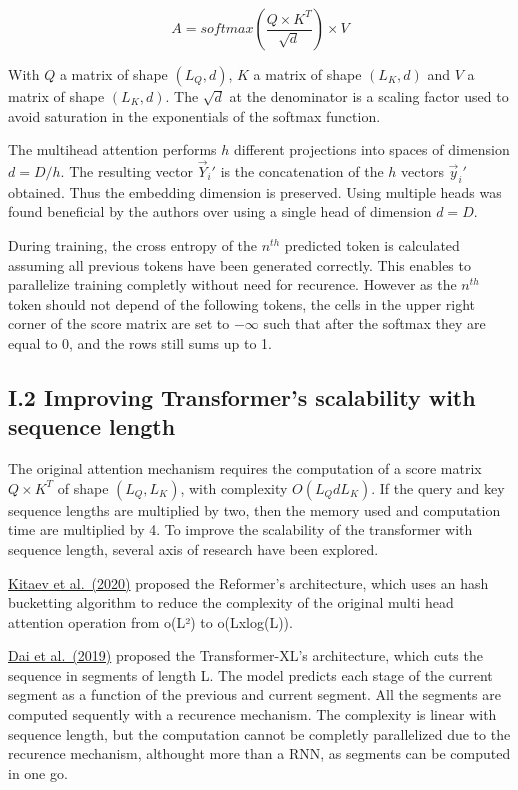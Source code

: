 \[A = softmax\left(\frac{Q \times K^T}{\sqrt{d}}\right) \times V\]

With \(Q\) a matrix of shape \((L_Q, d)\), \(K\) a matrix of shape
\((L_K, d)\) and \(V\) a matrix of shape \((L_K, d)\). The \(\sqrt{d}\)
at the denominator is a scaling factor used to avoid saturation in the
exponentials of the softmax function.

The multihead attention performs \(h\) different projections into spaces
of dimension \(d = D/h\). The resulting vector \(\vec{Y}_i'\) is the
concatenation of the \(h\) vectors \(\vec{y}_i'\) obtained. Thus the
embedding dimension is preserved. Using multiple heads was found
beneficial by the authors over using a single head of dimension
\(d = D\).

During training, the cross entropy of the \(n^{th}\) predicted token is
calculated assuming all previous tokens have been generated correctly.
This enables to parallelize training completly without need for
recurence. However as the \(n^{th}\) token should not depend of the
following tokens, the cells in the upper right corner of the score
matrix are set to \(-\infty\) such that after the softmax they are equal
to 0, and the rows still sums up to 1.

\hypertarget{i.2-improving-transformers-scalability-with-sequence-length}{%
\subsection{I.2 Improving Transformer's scalability with sequence
length}\label{i.2-improving-transformers-scalability-with-sequence-length}}

The original attention mechanism requires the computation of a score
matrix \(Q \times K^T\) of shape \((L_Q, L_K)\), with complexity
\(O(L_QdL_K)\). If the query and key sequence lengths are multiplied by
two, then the memory used and computation time are multiplied by 4. To
improve the scalability of the transformer with sequence length, several
axis of research have been explored.

\href{https://arxiv.org/abs/2001.04451}{Kitaev et al.~(2020)} proposed
the Reformer's architecture, which uses an hash bucketting algorithm to
reduce the complexity of the original multi head attention operation
from o(L²) to o(Lxlog(L)).

\href{https://arxiv.org/abs/1901.02860}{Dai et al.~(2019)} proposed the
Transformer-XL's architecture, which cuts the sequence in segments of
length L. The model predicts each stage of the current segment as a
function of the previous and current segment. All the segments are
computed sequently with a recurence mechanism. The complexity is linear
with sequence length, but the computation cannot be completly
parallelized due to the recurence mechanism, althought more than a RNN,
as segments can be computed in one go.

